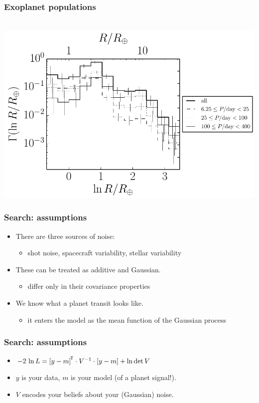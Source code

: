 \documentclass[pdftex]{beamer}
\begin{document}
\begin{frame}
  \frametitle{Exoplanet populations}
  ~\hfill
  \includegraphics[height=\figureheight]{1406.3020/results-radius.pdf}
\end{frame}

\begin{frame}
  \frametitle{Search: assumptions}
  \begin{itemize}
  \item There are three sources of noise:
    \begin{itemize}
    \item shot noise, spacecraft variability, stellar variability
    \end{itemize}
  \item These can be treated as additive and Gaussian.
    \begin{itemize}
    \item differ only in their covariance properties
    \end{itemize}
  \item We know what a planet transit looks like.
    \begin{itemize}
    \item it enters the model as the mean function of the Gaussian process
    \end{itemize}
  \end{itemize}
\end{frame}

\begin{frame}
  \frametitle{Search: assumptions}
  \begin{itemize}
  \item $-2\,\ln L = {[y - m]}^{\mathsf{\!T}}\cdot V^{-1}\cdot [y - m] + \ln\det V$
  \item $y$ is your data, $m$ is your model (of a planet signal!).
  \item $V$ encodes your beliefs about your (Gaussian) noise.
  \end{itemize}
\end{frame}
\end{document}
